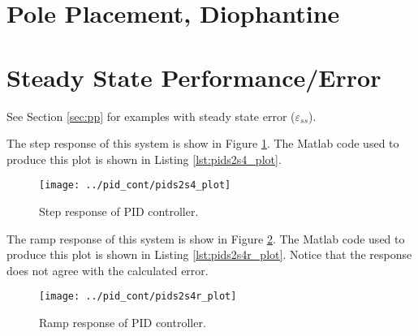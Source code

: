 \documentclass{article}
\newcommand{\sincludepdf}[2][]{
	
}
\begin{document}
\clearpage
\section{Pole Placement, Diophantine}

\section{Steady State Performance/Error}

See Section \ref{sec:pp} for examples with steady state error ($\varepsilon_{ss}$).


\sincludepdf[pages={5},
			pagecommand=\section{PID Controller Design}\subsection*{Example 1}
		]{scan/11221301.pdf}

\sincludepdf[pages={7}]{scan/11241301.pdf}

The step response of this system is show in Figure \ref{fig:pids2s4_plot}.
The Matlab code used to produce this plot is shown
in Listing \ref{lst:pids2s4_plot}.

\begin{figure}[h!]
\begin{center}
\texttt{[image: ../pid\_cont/pids2s4\_plot]}
\end{center}
\caption{Step response of PID controller.}
\label{fig:pids2s4_plot}
\end{figure}



\sincludepdf[pages={8}]{scan/11241301.pdf}

The ramp response of this system is show in Figure \ref{fig:pids2s4r_plot}.
The Matlab code used to produce this plot is shown
in Listing \ref{lst:pids2s4r_plot}.
Notice that the response does not agree with the calculated error.

\begin{figure}[h!]
\begin{center}
\texttt{[image: ../pid\_cont/pids2s4r\_plot]}
\end{center}
\caption{Ramp response of PID controller.}
\label{fig:pids2s4r_plot}
\end{figure}
\end{document}
